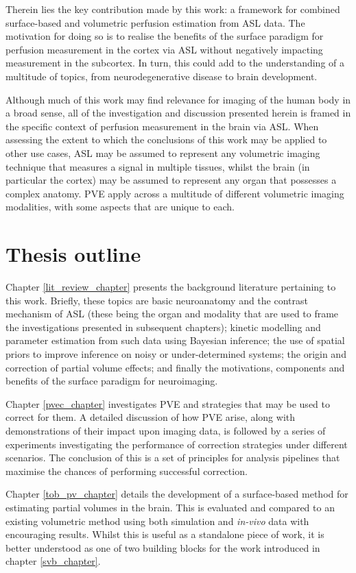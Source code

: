 Therein lies the key contribution made by this work: a framework for combined surface-based and volumetric perfusion estimation from ASL data. The motivation for doing so is to realise the benefits of the surface paradigm for perfusion measurement in the cortex via ASL without negatively impacting measurement in the subcortex. In turn, this could add to the understanding of a multitude of topics, from neurodegenerative disease to brain development. 

Although much of this work may find relevance for imaging of the human body in a broad sense, all of the investigation and discussion presented herein is framed in the specific context of perfusion measurement in the brain via ASL. When assessing the extent to which the conclusions of this work may be applied to other use cases, ASL may be assumed to represent any volumetric imaging technique that measures a signal in multiple tissues, whilst the brain (in particular the cortex) may be assumed to represent any organ that possesses a complex anatomy. PVE apply across a multitude of different volumetric imaging modalities, with some aspects that are unique to each. 

\section{Thesis outline}

Chapter \ref{lit_review_chapter} presents the background literature pertaining to this work. Briefly, these topics are basic neuroanatomy and the contrast mechanism of ASL (these being the organ and modality that are used to frame the investigations presented in subsequent chapters); kinetic modelling and parameter estimation from such data using Bayesian inference; the use of spatial priors to improve inference on noisy or under-determined systems; the origin and correction of partial volume effects; and finally the motivations, components and benefits of the surface paradigm for neuroimaging. 

Chapter \ref{pvec_chapter} investigates PVE and strategies that may be used to correct for them. A detailed discussion of how PVE arise, along with demonstrations of their impact upon imaging data, is followed by a series of experiments investigating the performance of correction strategies under different scenarios. The conclusion of this is a set of principles for analysis pipelines that maximise the chances of performing successful correction. 

Chapter \ref{tob_pv_chapter} details the development of a surface-based method for estimating partial volumes in the brain. This is evaluated and compared to an existing volumetric method using both simulation and \textit{in-vivo} data with encouraging results. Whilst this is useful as a standalone piece of work, it is better understood as one of two building blocks for the work introduced in chapter \ref{svb_chapter}.  

